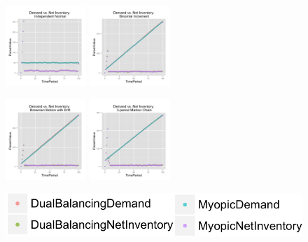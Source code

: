 \documentclass{beamer}
\begin{document}
\begin{frame}
  \begin{figure}[ht]
  \begin{minipage}[b]{.45\linewidth}
  \includegraphics[height=1.2in]{figures/DemandAndNetInventory_Normal.png}
  \end{minipage}
  \quad
  \begin{minipage}[b]{.45\linewidth}
  \includegraphics[height=1.2in]{figures/DemandAndNetInventory_Binomial.png}
  \end{minipage}
  \end{figure}
  \begin{figure}[ht]
  \begin{minipage}[b]{.45\linewidth}
  \includegraphics[height=1.2in]{figures/DemandAndNetInventory_Brownian.png}
  \end{minipage}
  \quad
  \begin{minipage}[b]{.45\linewidth}
  \includegraphics[height=1.2in]{figures/DemandAndNetInventory_Markov.png}
  \end{minipage}
  \end{figure}
  \begin{figure}[ht]
  \begin{minipage}[b]{.9\linewidth}
  \includegraphics[height=.35in]{figures/key2.png}
  \end{minipage}
  \end{figure}
\end{frame}
\end{document}
